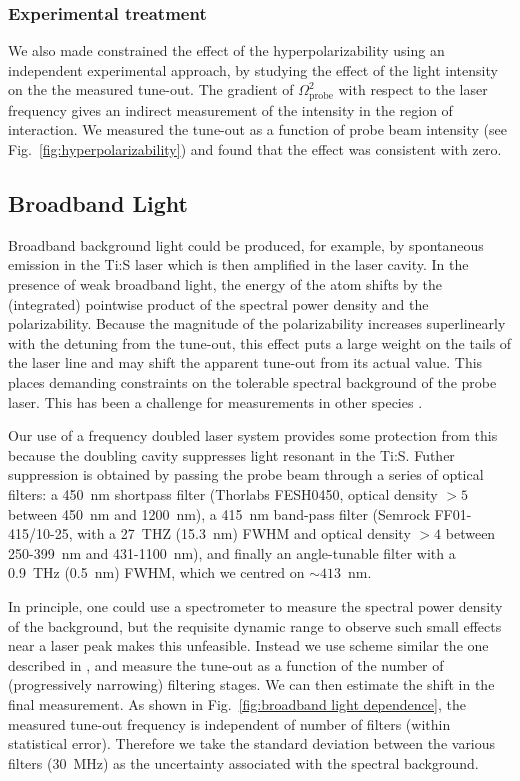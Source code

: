 \subsubsection{Experimental treatment}

	We also made constrained the effect of the hyperpolarizability using an independent experimental approach, by studying the effect of the light intensity on the the measured tune-out. 
	The gradient of \(\Omega_{\text{probe}}^2\) with respect to the laser frequency gives an indirect measurement of the intensity in the region of interaction. 
	We measured the tune-out as a function of probe beam intensity (see Fig.~\ref{fig:hyperpolarizability}) and found that the effect was consistent with zero.

\subsection{Broadband Light}

	Broadband background light could be produced, for example, by  spontaneous emission in the Ti:S laser which is then amplified in the laser cavity. 
	In the presence of weak broadband light, the energy of the atom shifts by the (integrated) pointwise product of the spectral power density and the polarizability. 
	Because the magnitude of the polarizability increases superlinearly with the detuning from the tune-out, this effect puts a large weight on the tails of the laser line and may shift the apparent tune-out from its actual value. 
	This places demanding constraints on the tolerable spectral background of the probe laser. 
	This has been a challenge for measurements in other species \cite{HolmgrenThesis}. 
	
	Our use of a frequency doubled laser system provides some protection from this because the doubling cavity suppresses light resonant in the Ti:S. 
	Futher suppression is obtained by passing the probe beam through a series of optical filters: a 450~nm shortpass filter (Thorlabs FESH0450, optical density $>5$ between 450~nm and 1200~nm), a 415~nm band-pass filter (Semrock FF01-415/10-25, with a 27~THZ (15.3~nm) FWHM and optical density $>4$ between 250-399~nm and 431-1100~nm), and finally an angle-tunable filter with a 0.9~THz (0.5~nm) FWHM, which we centred on \(\sim 413\)~nm.

	In principle, one could use a spectrometer to measure the spectral power density of the background, but the requisite dynamic range to observe such small effects near a laser peak makes this unfeasible.
	Instead we use scheme similar the one described in \cite{Leonard15}, and measure the tune-out as a function of the number of (progressively narrowing) filtering stages.
	We can then estimate the shift in the  final measurement. 
	As shown in Fig.~\ref{fig:broadband light dependence},  the measured tune-out frequency is independent of number of filters (within statistical error). 
	Therefore we take the standard deviation between the various filters (\(30\)~MHz)  as the uncertainty associated with the spectral background.
	 
